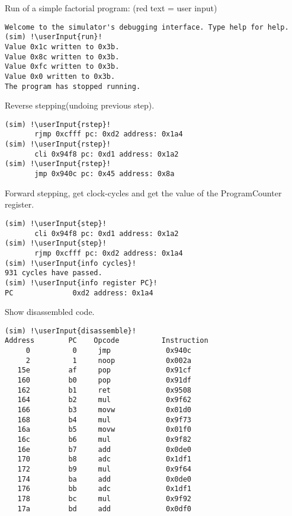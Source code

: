 \begin{block}{\large {}\vphantom{Simulator Debugger}}

\newcommand{\userInput}[1]{
	\textcolor{red}{#1}  
}

\tiny {


Run of a simple factorial program: (red text = user input)
\begin{lstlisting}[escapechar=!]
Welcome to the simulator's debugging interface. Type help for help. 
(sim) !\userInput{run}!
Value 0x1c written to 0x3b.
Value 0x8c written to 0x3b.
Value 0xfc written to 0x3b.
Value 0x0 written to 0x3b.
The program has stopped running.
\end{lstlisting}

Reverse stepping(undoing previous step).
\begin{lstlisting}[escapechar=!]
(sim) !\userInput{rstep}!
       rjmp 0xcfff pc: 0xd2 address: 0x1a4
(sim) !\userInput{rstep}!
       cli 0x94f8 pc: 0xd1 address: 0x1a2
(sim) !\userInput{rstep}!
       jmp 0x940c pc: 0x45 address: 0x8a
\end{lstlisting}
Forward stepping, get clock-cycles and get the value of the ProgramCounter register.
\begin{lstlisting}[escapechar=!]
(sim) !\userInput{step}!
       cli 0x94f8 pc: 0xd1 address: 0x1a2
(sim) !\userInput{step}!
       rjmp 0xcfff pc: 0xd2 address: 0x1a4
(sim) !\userInput{info cycles}!
931 cycles have passed.
(sim) !\userInput{info register PC}!
PC              0xd2 address: 0x1a4
\end{lstlisting}

Show disassembled code.
\begin{lstlisting}[escapechar=!]
(sim) !\userInput{disassemble}!
Address        PC    Opcode          Instruction    
     0          0     jmp             0x940c
     2          1     noop            0x002a
   15e         af     pop             0x91cf
   160         b0     pop             0x91df
   162         b1     ret             0x9508
   164         b2     mul             0x9f62
   166         b3     movw            0x01d0
   168         b4     mul             0x9f73
   16a         b5     movw            0x01f0
   16c         b6     mul             0x9f82
   16e         b7     add             0x0de0
   170         b8     adc             0x1df1
   172         b9     mul             0x9f64
   174         ba     add             0x0de0
   176         bb     adc             0x1df1
   178         bc     mul             0x9f92
   17a         bd     add             0x0df0
\end{lstlisting}

}


\end{block}

